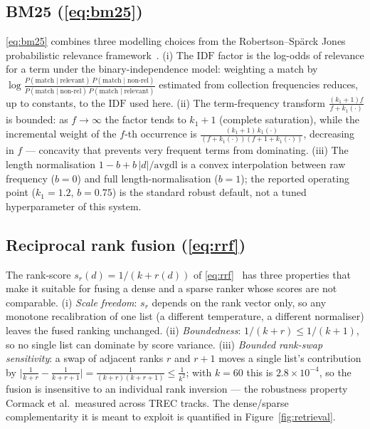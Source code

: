 \documentclass[11pt,a4paper]{article}
\theoremstyle{plain}
\theoremstyle{definition}
\begin{document}
\subsection{BM25 \texorpdfstring{(\eqref{eq:bm25})}{}}
\label{app:bm25}

\eqref{eq:bm25} combines three modelling choices from the Robertson--Sp\"arck
Jones probabilistic relevance framework~\cite{robertson2009bm25}.
(i) The $\mathrm{IDF}$ factor is the log-odds of relevance for a term
under the binary-independence model: weighting a match by
$\log\frac{P(\text{match}\mid\text{relevant})\,P(\text{match}\mid\text{non-rel})}
{P(\text{match}\mid\text{non-rel})\,P(\text{match}\mid\text{relevant})}$
estimated from collection frequencies reduces, up to constants, to the
$\mathrm{IDF}$ used here. (ii) The term-frequency transform
$\frac{(k_1+1)f}{f+k_1(\cdot)}$ is bounded: as $f\to\infty$ the factor
tends to $k_1+1$ (complete saturation), while the incremental weight of the
$f$-th occurrence is
$\frac{(k_1+1)\,k_1(\cdot)}{(f+k_1(\cdot))(f+1+k_1(\cdot))}$, decreasing in
$f$ --- concavity that prevents very frequent terms from dominating.
(iii) The length normalisation $1-b+b\,|d|/\mathrm{avgdl}$ is a convex
interpolation between raw frequency ($b=0$) and full
length-normalisation ($b=1$); the reported operating point
($k_1=1.2$, $b=0.75$) is the standard robust default, not a tuned
hyperparameter of this system.

\subsection{Reciprocal rank fusion \texorpdfstring{(\eqref{eq:rrf})}{}}
\label{app:rrf}

The rank-score $s_r(d)=1/(k+r(d))$ of \eqref{eq:rrf}~\cite{cormack2009rrf}
has three properties that make it suitable for fusing a dense and a sparse
ranker whose scores are not comparable.
(i) \emph{Scale freedom}: $s_r$ depends on the rank vector only, so any
monotone recalibration of one list (a different temperature, a different
normaliser) leaves the fused ranking unchanged.
(ii) \emph{Boundedness}: $1/(k+r)\le 1/(k+1)$, so no single list can
dominate by score variance.
(iii) \emph{Bounded rank-swap sensitivity}: a swap of adjacent ranks $r$
and $r+1$ moves a single list's contribution by
$\big|\frac{1}{k+r}-\frac{1}{k+r+1}\big|=\frac{1}{(k+r)(k+r+1)}\le
\frac{1}{k^2}$; with $k=60$ this is $2.8\times10^{-4}$, so the fusion is
insensitive to an individual rank inversion --- the robustness property
Cormack et al.\ measured across TREC tracks. The dense/sparse
complementarity it is meant to exploit is quantified in
Figure~\ref{fig:retrieval}.
\end{document}
